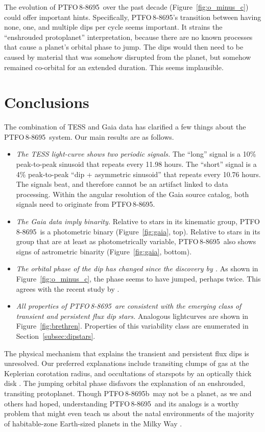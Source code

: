 \documentclass[12pt,twocolumn,tighten]{aastex62}
\newcommand{\ptfo}{PTFO$\,$8-8695}
\newcommand{\ptfob}{PTFO$\,$8-8695b}
\begin{document}
The evolution of \ptfo\ over the past decade
(Figure~\ref{fig:o_minus_c}) could offer important hints.
Specifically, \ptfo's transition between having none, one, and
multiple dips per cycle seems important.  It strains the ``enshrouded
protoplanet'' interpretation, because there are no known processes
that cause a planet's orbital phase to jump.  The dips would then need
to be caused by material that was somehow disrupted from the planet,
but somehow remained co-orbital for an extended duration. This seems
implausible.

\section{Conclusions}
\label{sec:conclusions}

The combination of TESS and Gaia data has clarified a few things about
the \ptfo\ system.  Our main results are as follows.
\begin{itemize}
  \item {\it The TESS light-curve shows two periodic signals.} The
    ``long'' signal is a 10\% peak-to-peak sinusoid that repeats every
    11.98 hours.  The ``short'' signal is a 4\% peak-to-peak ``dip +
    asymmetric sinusoid'' that repeats every 10.76 hours. The signals
    beat, and therefore cannot be an artifact linked to data
    processing.  Within the angular resolution of the Gaia source
    catalog, both signals need to originate from \ptfo.
  \item {\it The Gaia data imply binarity.} Relative to stars in its
    kinematic group, \ptfo\ is a photometric binary
    (Figure~\ref{fig:gaia}, top).  Relative to stars in its group that
    are at least as photometrically variable, \ptfo\ also shows signs
    of astrometric binarity (Figure~\ref{fig:gaia}, bottom).
  \item {\it The orbital phase of the dip has changed since the
    discovery by \citet{van_eyken_ptf_2012}.} As shown in
    Figure~\ref{fig:o_minus_c}, the phase seems to have jumped,
    perhaps twice. This agrees with the recent study by
    \citet{tanimoto_evidence_2020}.
  \item {\it All properties of \ptfo\ are consistent with the emerging
    class of transient and persistent flux dip stars.} Analogous
    lightcurves are shown in Figure~\ref{fig:brethren}.  Properties of
    this variability class are enumerated in
    Section~\ref{subsec:dipstars}.
\end{itemize}

The physical mechanism that explains the transient and persistent flux
dips is unresolved. Our preferred explanations include transiting
clumps of gas at the Keplerian corotation radius, and occultations of
starspots by an optically thick disk \citep[{\it
e.g.},][]{stauffer_orbiting_2017,david_transient_2017,zhan_complex_2019}.
The jumping orbital phase disfavors the explanation of an enshrouded,
transiting protoplanet.  Though \ptfob\ may not be a planet, as we and
others had hoped, understanding \ptfo\ and its analogs is a worthy
problem that might even teach us about the natal environments of the
majority of habitable-zone Earth-sized planets in the Milky Way
\citep{dressing_occurrence_2013}.
\end{document}
